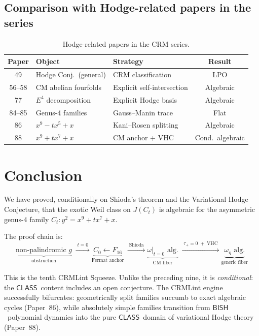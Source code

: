 \documentclass[11pt]{article}
\theoremstyle{plain}
\theoremstyle{definition}
\theoremstyle{remark}
\newcommand{\BISH}{\ensuremath{\mathsf{BISH}}}
\newcommand{\CLASS}{\ensuremath{\mathsf{CLASS}}}
\begin{document}
\subsection{Comparison with Hodge-related papers in the series}

\begin{table}[h]
\centering
\small
\begin{tabular}{c l l c}
\toprule
\textbf{Paper} & \textbf{Object} & \textbf{Strategy}
  & \textbf{Result} \\
\midrule
49 & Hodge Conj.\ (general) & CRM classification & LPO \\
56--58 & CM abelian fourfolds & Explicit self-intersection
  & Algebraic \\
77 & $E^4$ decomposition & Explicit Hodge basis & Algebraic \\
84--85 & Genus-4 families & Gauss--Manin trace & Flat \\
86 & $x^9 - tx^5 + x$ & Kani--Rosen splitting & Algebraic \\
88 & $x^9 + tx^7 + x$ & CM anchor + VHC & Cond.\ algebraic \\
\bottomrule
\end{tabular}
\caption{Hodge-related papers in the CRM series.}
\label{tab:hodge}
\end{table}

\section{Conclusion}
\label{sec:conclusion}

We have proved, conditionally on Shioda's theorem and the
Variational Hodge Conjecture, that the exotic Weil class on
$J(C_t)$ is algebraic for the asymmetric genus-4 family
$C_t\colon y^2 = x^9 + tx^7 + x$.

The proof chain is:
\[
  \underbrace{\text{non-palindromic } g}_{\text{obstruction}}
  \;\xrightarrow{\;t = 0\;}
  \underbrace{C_0 \leftarrow F_{16}}_{\text{Fermat anchor}}
  \;\xrightarrow{\;\text{Shioda}\;}
  \underbrace{\omega|_{t=0}\text{ alg.}}_{\text{CM fiber}}
  \;\xrightarrow{\;\tau_+=0\;+\;\text{VHC}\;}
  \underbrace{\omega_\eta\text{ alg.}}_{\text{generic fiber}}
\]

This is the tenth CRMLint Squeeze.  Unlike the preceding nine,
it is \emph{conditional}: the \CLASS\ content includes an open
conjecture.  The CRMLint engine successfully bifurcates:
geometrically split families succumb to exact algebraic cycles
(Paper~86), while absolutely simple families transition from
\BISH\ polynomial dynamics into the pure \CLASS\ domain of
variational Hodge theory (Paper~88).
\end{document}
